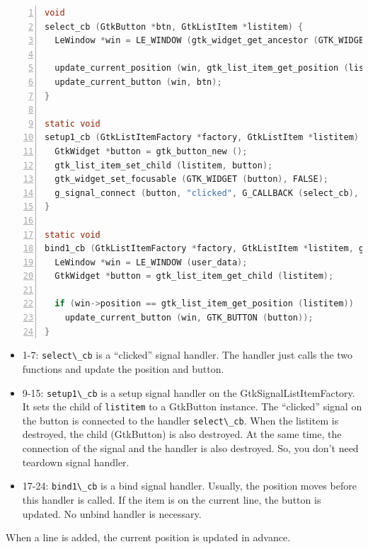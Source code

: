 \begin{lstlisting}[language=C, numbers=left]
void
select_cb (GtkButton *btn, GtkListItem *listitem) {
  LeWindow *win = LE_WINDOW (gtk_widget_get_ancestor (GTK_WIDGET (btn), LE_TYPE_WINDOW));

  update_current_position (win, gtk_list_item_get_position (listitem));
  update_current_button (win, btn);
}

static void
setup1_cb (GtkListItemFactory *factory, GtkListItem *listitem) {
  GtkWidget *button = gtk_button_new ();
  gtk_list_item_set_child (listitem, button);
  gtk_widget_set_focusable (GTK_WIDGET (button), FALSE);
  g_signal_connect (button, "clicked", G_CALLBACK (select_cb), listitem);
}

static void
bind1_cb (GtkListItemFactory *factory, GtkListItem *listitem, gpointer user_data) {
  LeWindow *win = LE_WINDOW (user_data);
  GtkWidget *button = gtk_list_item_get_child (listitem);

  if (win->position == gtk_list_item_get_position (listitem))
    update_current_button (win, GTK_BUTTON (button));
}
\end{lstlisting}

\begin{itemize}
\tightlist
\item
  1-7: \passthrough{\lstinline!select\_cb!} is a ``clicked'' signal
  handler. The handler just calls the two functions and update the
  position and button.
\item
  9-15: \passthrough{\lstinline!setup1\_cb!} is a setup signal handler
  on the GtkSignalListItemFactory. It sets the child of
  \passthrough{\lstinline!listitem!} to a GtkButton instance. The
  ``clicked'' signal on the button is connected to the handler
  \passthrough{\lstinline!select\_cb!}. When the listitem is destroyed,
  the child (GtkButton) is also destroyed. At the same time, the
  connection of the signal and the handler is also destroyed. So, you
  don't need teardown signal handler.
\item
  17-24: \passthrough{\lstinline!bind1\_cb!} is a bind signal handler.
  Usually, the position moves before this handler is called. If the item
  is on the current line, the button is updated. No unbind handler is
  necessary.
\end{itemize}

When a line is added, the current position is updated in advance.

